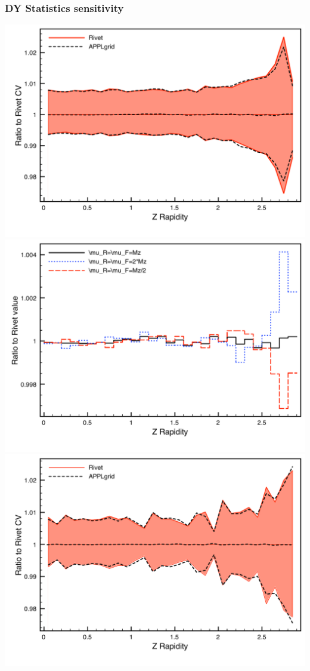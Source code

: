 \documentclass[10pt]{beamer}
\begin{document}
\begin{frame}
\frametitle{DY Statistics sensitivity}
\includegraphics[width=0.45\paperwidth]{100MDYScales_Plot.pdf}
\includegraphics[width=0.45\paperwidth]{100MDYRatioScales_Plot.pdf}\\
\includegraphics[width=0.45\paperwidth]{10MDYScales_Plot.pdf}

\end{frame}
\end{document}
